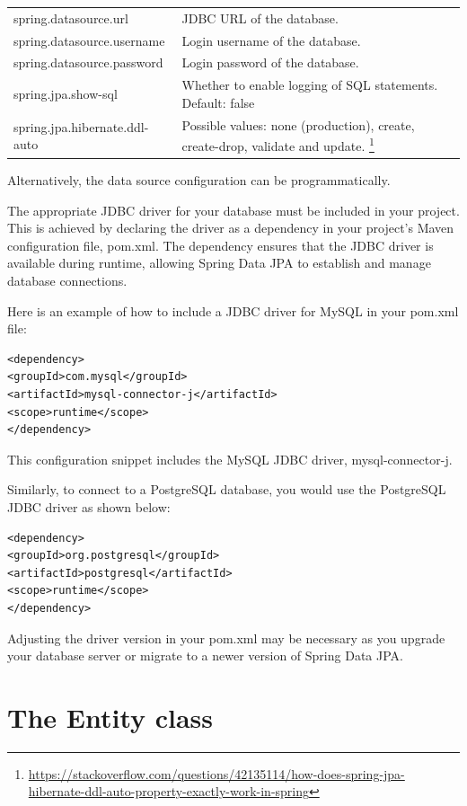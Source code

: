 \begin{tabular}{|l|p{8cm}|}
\hline
spring.datasource.url & JDBC URL of the database.\\
spring.datasource.username & Login username of the database.\\
spring.datasource.password & Login password of the database.\\
spring.jpa.show-sql & Whether to enable logging of SQL statements. Default: false\\
spring.jpa.hibernate.ddl-auto & Possible values: none (production), create, create-drop, validate and update. \footnote{\url{https://stackoverflow.com/questions/42135114/how-does-spring-jpa-hibernate-ddl-auto-property-exactly-work-in-spring}}\\
\hline
\end{tabular}

Alternatively, the data source configuration can be programmatically.

The appropriate JDBC driver for your database must be included in your project. This is achieved by declaring the driver as a dependency in your project's Maven configuration file, pom.xml. The dependency ensures that the JDBC driver is available during runtime, allowing Spring Data JPA to establish and manage database connections.

Here is an example of how to include a JDBC driver for MySQL in your pom.xml file:

\begin{lstlisting}
<dependency>
<groupId>com.mysql</groupId>
<artifactId>mysql-connector-j</artifactId>
<scope>runtime</scope>
</dependency>
\end{lstlisting}

This configuration snippet includes the MySQL JDBC driver, mysql-connector-j.

Similarly,  to connect to a PostgreSQL database, you would use the PostgreSQL JDBC driver as shown below:

\begin{lstlisting}
<dependency>
<groupId>org.postgresql</groupId>
<artifactId>postgresql</artifactId>
<scope>runtime</scope>
</dependency>
\end{lstlisting}

Adjusting the driver version in your pom.xml may be necessary as you upgrade your database server or migrate to a newer version of Spring Data JPA.


\section{The Entity class}

